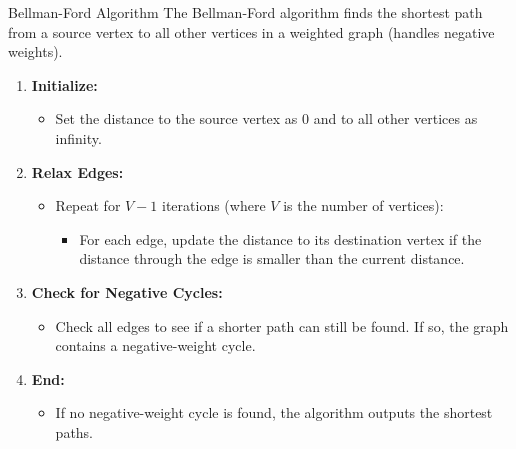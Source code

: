 \begin{usage}[]{Bellman-Ford Algorithm}
    The Bellman-Ford algorithm finds the shortest path from a source vertex to all other vertices in a weighted graph (handles negative weights).

    \begin{enumerate}
        \item \textbf{Initialize:}
              \begin{itemize}
                  \item Set the distance to the source vertex as 0 and to all other vertices as infinity.
              \end{itemize}

        \item \textbf{Relax Edges:}
              \begin{itemize}
                  \item Repeat for \(V-1\) iterations (where \(V\) is the number of vertices):
                        \begin{itemize}
                            \item For each edge, update the distance to its destination vertex if the distance through the edge is smaller than the current distance.
                        \end{itemize}
              \end{itemize}

        \item \textbf{Check for Negative Cycles:}
              \begin{itemize}
                  \item Check all edges to see if a shorter path can still be found. If so, the graph contains a negative-weight cycle.
              \end{itemize}

        \item \textbf{End:}
              \begin{itemize}
                  \item If no negative-weight cycle is found, the algorithm outputs the shortest paths.
              \end{itemize}
    \end{enumerate}
\end{usage}



